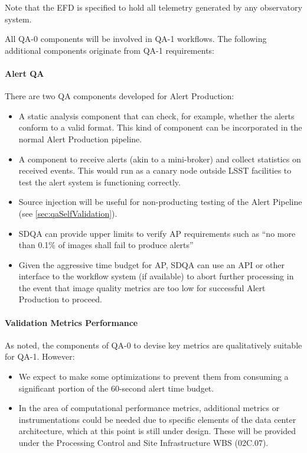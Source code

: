 Note that the EFD is specified to hold all telemetry generated by any observatory system.

All QA-0 components will be involved in QA-1 workflows. The following additional components originate from QA-1 requirements:

\paragraph{Alert QA}
\label{sec:qaAlertQA}

There are two QA components developed for Alert Production:

\begin{itemize}

\item A static analysis component that can check, for example, whether the alerts conform to a valid format. This kind of component can be incorporated in the normal Alert Production pipeline.

\item A component to receive alerts (akin to a mini-broker) and collect statistics on received events. This would run as a canary node outside LSST facilities to test the alert system is functioning correctly.

\item Source injection will be useful for non-producting testing of the Alert Pipeline (see \ref{sec:qaSelfValidation}).

\item SDQA can provide upper limits to verify AP requirements such as ``no more than 0.1\% of images shall fail to produce alerts''

\item Given the aggressive time budget for AP, SDQA can use an API or other interface to the workflow system (if available) to abort further processing in the event that image quality metrics are too low for successful Alert Production to proceed. 

\end{itemize}

\paragraph{Validation Metrics Performance}
\label{sec:qaPerfValidate}

As noted, the components of QA-0 to devise key metrics are qualitatively suitable for QA-1. However:

\begin{itemize}

\item We expect to make some optimizations to prevent them from consuming a significant portion of the 60-second alert time budget.

\item In the area of computational performance metrics, additional metrics or instrumentations could be needed due to specific elements of the data center architecture, which at this point is still under design. These will be provided under the Processing Control and Site Infrastructure WBS (02C.07).

\end{itemize}

